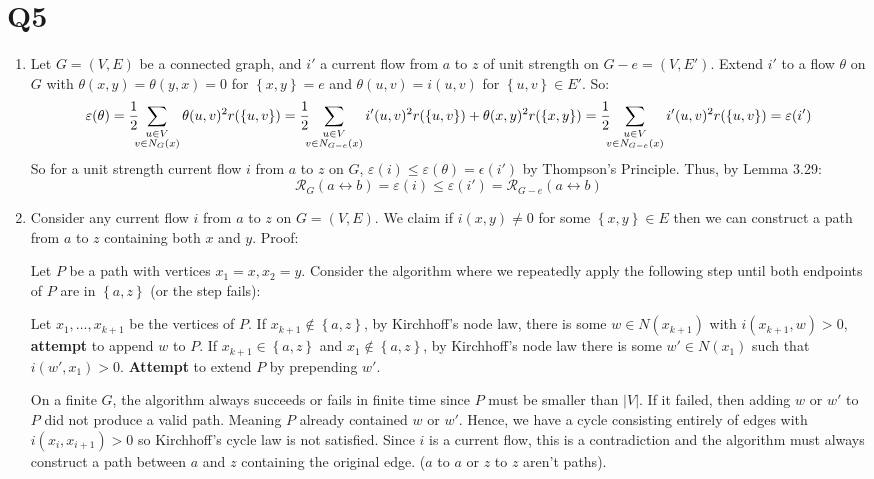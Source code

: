 \documentclass[a4paper, 11pt]{article}
\def\set#1{\left\{ #1 \right\}}
\def\abs#1{\left|#1\right|}
\begin{document}
\section*{Q5}
\begin{enumerate}[label=(\alph*)]
	\item
		Let $G=(V,E)$ be a connected graph, and $i'$ a current flow from $a$ to $z$ of unit strength on $G-e=(V,E')$. Extend $i'$ to a flow $\theta$ on $G$ with $\theta(x,y)=\theta(y,x)=0$ for $\set{x,y}=e$ and $\theta(u,v)=i(u,v)$ for $\set{u,v}\in E'$. So:
	      \[
		      \varepsilon(\theta)
		      =\frac12\hspace{-0.5em}\sum_{\substack{u\in V\\ v\in N_G(x)}}\theta(u,v)^2r(\set{u,v})
		      =\frac12\hspace{-0.5em}\sum_{\substack{u\in V\\ v\in N_{G-e}(x)}}i'(u,v)^2r(\set{u,v}) + \theta(x,y)^2r(\set{x,y})
		      =\frac12\hspace{-0.5em}\sum_{\substack{u\in V\\ v\in N_{G-e}(x)}}i'(u,v)^2r(\set{u,v})
			  =\varepsilon(i')
	      \]
		So for a unit strength current flow $i$ from $a$ to $z$ on $G$, $\varepsilon(i)\leq\varepsilon(\theta)=\epsilon(i')$ by Thompson's Principle. Thus, by Lemma 3.29:
		$$\mathcal{R}_G(a\leftrightarrow b)=\varepsilon(i)\leq\varepsilon(i')= \mathcal{R}_{G-e}(a\leftrightarrow b)$$

	\item 
		Consider any current flow $i$ from $a$ to $z$ on $G=(V,E)$. We claim if $i(x,y)\neq0$ for some $\set{x,y}\in E$ then we can construct a path from $a$ to $z$ containing both $x$ and $y$. Proof:
		\begin{mdframed}
			Let $P$ be a path with vertices $x_1=x,x_2=y$. Consider the algorithm where we repeatedly apply the following step until both endpoints of $P$ are in $\set{a,z}$ (or the step fails):
			
			Let $x_1,\dots,x_{k+1}$ be the vertices of $P$. If $x_{k+1}\notin\set{a,z}$, by Kirchhoff's node law, there is some $w\in N(x_{k+1})$ with $i(x_{k+1},w)>0$, \textbf{attempt} to append $w$ to $P$. If $x_{k+1}\in\set{a,z}$ and $x_1\notin\set{a,z}$, by Kirchhoff's node law there is some $w'\in N(x_1)$ such that $i(w',x_1)>0$. \textbf{Attempt} to extend $P$ by prepending $w'$.

			On a finite $G$, the algorithm always succeeds or fails in finite time since  $P$ must be smaller than $\abs{V}$. If it failed, then adding $w$ or $w'$ to $P$ did not produce a valid path. Meaning $P$ already contained $w$ or $w'$. Hence, we have a cycle consisting entirely of edges with $i(x_{i},x_{i+1})>0$ so Kirchhoff's cycle law is not satisfied. Since $i$ is a current flow, this is a contradiction and the algorithm must always construct a path between $a$ and $z$ containing the original edge. ($a$ to $a$ or $z$ to $z$ aren't paths). 
		\end{mdframed}
		

\end{enumerate}
\end{document}
